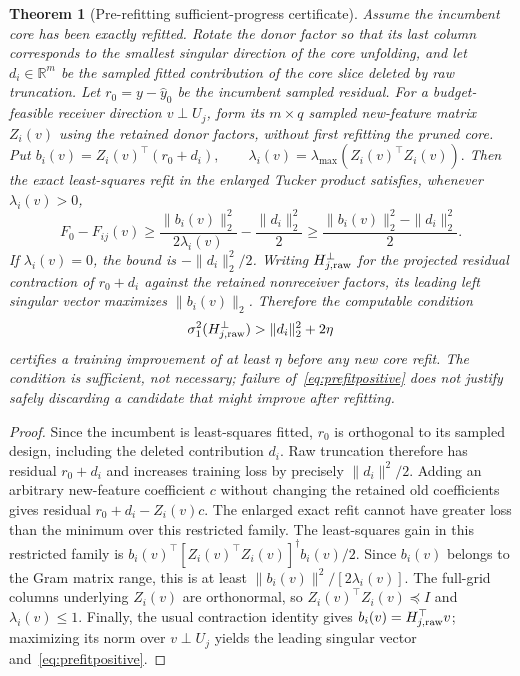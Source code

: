\documentclass[review,10pt]{elsarticle}
\newtheorem{theorem}{Theorem}
\newcommand{\R}{\mathbb R}
\begin{document}
\begin{theorem}[Pre-refitting sufficient-progress certificate]\label{thm:prefit}
Assume the incumbent core has been exactly refitted. Rotate the donor factor so that its last column corresponds to the smallest singular direction of the core unfolding, and let $d_i\in\R^m$ be the \emph{sampled fitted contribution} of the core slice deleted by raw truncation. Let $r_0=y-\widehat y_0$ be the incumbent sampled residual. For a budget-feasible receiver direction $v\perp U_j$, form its $m\times q$ sampled new-feature matrix $Z_i(v)$ using the retained donor factors, without first refitting the pruned core. Put
 \(b_i(v)=Z_i(v)^\top(r_0+d_i),\qquad \lambda_i(v)=\lambda_{\max}(Z_i(v)^\top Z_i(v)).\) 
Then the exact least-squares refit in the enlarged Tucker product satisfies, whenever $\lambda_i(v)>0$,
\begin{equation}\label{eq:prefitcert}
\boxed{\;F_0-F_{ij}(v)\ge
 \frac{\|b_i(v)\|_2^2}{2\lambda_i(v)}
 -\frac{\|d_i\|_2^2}{2}
 \ge \frac{\|b_i(v)\|_2^2-\|d_i\|_2^2}{2}.\;}
\end{equation}
If $\lambda_i(v)=0$, the bound is $-\|d_i\|_2^2/2$. Writing
$H_{j,\rm raw}^{\perp}$ for the projected residual contraction of $r_0+d_i$ against the retained nonreceiver factors, its leading left singular vector maximizes $\|b_i(v)\|_2$. Therefore the computable condition
\begin{equation}\label{eq:prefitpositive}
\sigma_1^2(H_{j,\rm raw}^{\perp})>\|d_i\|_2^2+2\eta
\end{equation}
certifies a training improvement of at least $\eta$ \emph{before any new core refit}. The condition is sufficient, not necessary; failure of~\eqref{eq:prefitpositive} does not justify safely discarding a candidate that might improve after refitting.
\end{theorem}
\begin{proof}
Since the incumbent is least-squares fitted, $r_0$ is orthogonal to its sampled design, including the deleted contribution $d_i$. Raw truncation therefore has residual $r_0+d_i$ and increases training loss by precisely $\|d_i\|^2/2$. Adding an arbitrary new-feature coefficient $c$ without changing the retained old coefficients gives residual $r_0+d_i-Z_i(v)c$. The enlarged exact refit cannot have greater loss than the minimum over this restricted family. The least-squares gain in this restricted family is $b_i(v)^\top[Z_i(v)^\top Z_i(v)]^\dagger b_i(v)/2$. Since $b_i(v)$ belongs to the Gram matrix range, this is at least $\|b_i(v)\|^2/[2\lambda_i(v)]$. The full-grid columns underlying $Z_i(v)$ are orthonormal, so $Z_i(v)^\top Z_i(v)\preceq I$ and $\lambda_i(v)\le1$. Finally, the usual contraction identity gives $b_i(v)=H_{j,\rm raw}^{\top}v$; maximizing its norm over $v\perp U_j$ yields the leading singular vector and~\eqref{eq:prefitpositive}.\end{proof}
\end{document}
